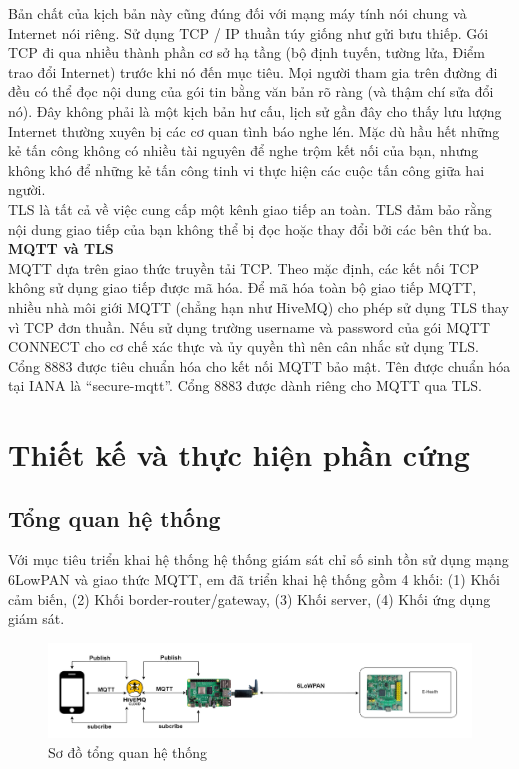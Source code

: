 \documentclass{report}
\begin{document}
Bản chất của kịch bản này cũng đúng đối với mạng máy tính nói chung và Internet nói riêng. Sử dụng TCP / IP thuần túy giống như gửi bưu thiếp. Gói TCP đi qua nhiều thành phần cơ sở hạ tầng (bộ định tuyến, tường lửa, Điểm trao đổi Internet) trước khi nó đến mục tiêu. Mọi người tham gia trên đường đi đều có thể đọc nội dung của gói tin bằng văn bản rõ ràng (và thậm chí sửa đổi nó). Đây không phải là một kịch bản hư cấu, lịch sử gần đây cho thấy lưu lượng Internet thường xuyên bị các cơ quan tình báo nghe lén. Mặc dù hầu hết những kẻ tấn công không có nhiều tài nguyên để nghe trộm kết nối của bạn, nhưng không khó để những kẻ tấn công tinh vi thực hiện các cuộc tấn công giữa hai người.\\

TLS là tất cả về việc cung cấp một kênh giao tiếp an toàn. TLS đảm bảo rằng nội dung giao tiếp của bạn không thể bị đọc hoặc thay đổi bởi các bên thứ ba. \\

\noindent
\textbf{MQTT và TLS} \\

MQTT dựa trên giao thức truyền tải TCP. Theo mặc định, các kết nối TCP không sử dụng giao tiếp được mã hóa. Để mã hóa toàn bộ giao tiếp MQTT, nhiều nhà môi giới MQTT (chẳng hạn như HiveMQ) cho phép sử dụng TLS thay vì TCP đơn thuần. Nếu sử dụng trường username và password của gói MQTT CONNECT cho cơ chế xác thực và ủy quyền  thì nên cân nhắc sử dụng TLS. \\

Cổng 8883 được tiêu chuẩn hóa cho kết nối MQTT bảo mật. Tên được chuẩn hóa tại IANA là “secure-mqtt”. Cổng 8883 được dành riêng cho MQTT qua TLS.

\newpage
\chapter{Thiết kế và thực hiện phần cứng}
\section{Tổng quan hệ thống}
Với mục tiêu triển khai hệ thống hệ thống giám sát chỉ số sinh tồn sử dụng mạng
6LowPAN và giao thức MQTT, em đã triển khai hệ thống gồm 4 khối: (1) Khối cảm biến, (2)
Khối border-router/gateway, (3) Khối server, (4) Khối ứng dụng giám sát.
\begin{figure}[h]
	\centering
	\includegraphics[scale = 0.5]{fig33.png}
	\caption{Sơ đồ tổng quan hệ thống}
	\label{fig:Graph33}
\end{figure}
\end{document}
